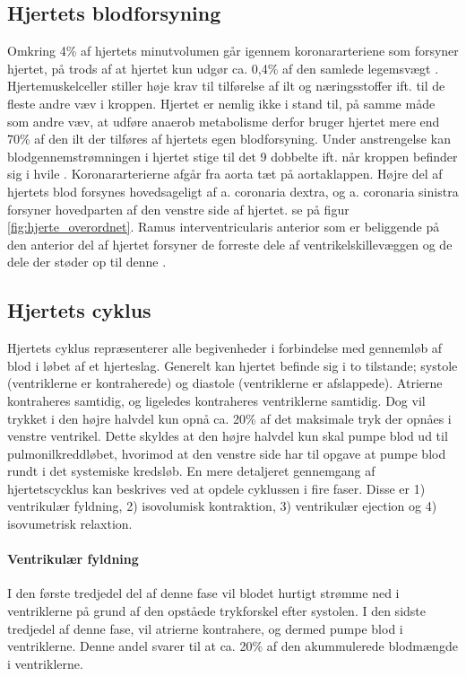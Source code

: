 \subsection{Hjertets blodforsyning}
Omkring 4\% af hjertets minutvolumen går igennem koronararteriene som forsyner hjertet, på trods af at hjertet kun udgør ca. 0,4\% af den samlede legemsvægt \cite{gronanatomi}. Hjertemuskelceller stiller høje krav til tilførelse af ilt og næringsstoffer ift. til de fleste andre væv i kroppen. Hjertet er nemlig ikke i stand til, på samme måde som andre væv, at udføre anaerob metabolisme derfor bruger hjertet mere end 70\% af den ilt der tilføres af hjertets egen blodforsyning. Under anstrengelse kan blodgennemstrømningen i hjertet stige til det 9 dobbelte ift. når kroppen befinder sig i hvile \cite{martini}. Koronararterierne afgår fra aorta tæt på aortaklappen. Højre del af hjertets blod forsynes hovedsageligt af a. coronaria dextra, og a. coronaria sinistra forsyner hovedparten af den venstre side af hjertet. se på figur \ref{fig:hjerte_overordnet}. Ramus interventricularis anterior som er beliggende på den anterior del af hjertet forsyner de forreste dele af ventrikelskillevæggen og de dele der støder op til denne \cite{gronanatomi}.

\newpage
\subsection{Hjertets cyklus}
Hjertets cyklus repræsenterer alle begivenheder i forbindelse med gennemløb af blod i løbet af et hjerteslag. Generelt kan hjertet befinde sig i to tilstande; systole (ventriklerne er kontraherede) og diastole (ventriklerne er afslappede). Atrierne kontraheres samtidig, og ligeledes kontraheres ventriklerne samtidig. Dog vil trykket i den højre halvdel kun opnå ca. 20\% af det maksimale tryk der opnåes i venstre ventrikel. Dette skyldes at den højre halvdel kun skal pumpe blod ud til pulmonilkreddløbet, hvorimod at den venstre side har til opgave at pumpe blod rundt i det systemiske kredsløb. En mere detaljeret gennemgang af hjertetscycklus kan beskrives ved at opdele cyklussen i fire faser. Disse er 1) ventrikulær fyldning, 2) isovolumisk kontraktion, 3) ventrikulær ejection og 4) isovumetrisk relaxtion.

\paragraph*{Ventrikulær fyldning}
I den første tredjedel del af denne fase vil blodet hurtigt strømme ned i ventriklerne på grund af den opståede trykforskel efter systolen. I den sidste tredjedel af denne fase, vil atrierne kontrahere, og dermed pumpe blod i ventriklerne. Denne andel svarer til at ca. 20\% af den akummulerede blodmængde i ventriklerne. 

